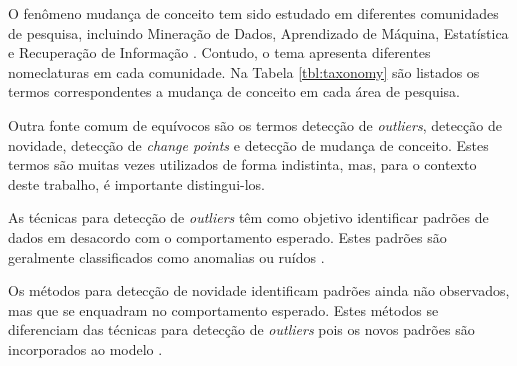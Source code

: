 \documentclass[msc, classic, a4paper]{ufbathesis}
\begin{document}
O fenômeno mudança de conceito tem sido estudado em diferentes comunidades de pesquisa, incluindo Mineração de Dados,
Aprendizado de Máquina, Estatística e Recuperação de Informação \cite{Zliobaite:2010}.
Contudo, o tema apresenta diferentes nomeclaturas em cada comunidade.
Na Tabela \ref{tbl:taxonomy} são listados os termos correspondentes a mudança de conceito em cada área de pesquisa.

\begin{table}[!ht]
    \caption{Terminologia - Mudança de Conceito \cite{Zliobaite:2010}}
    \label{tbl:taxonomy}
    \centering
\end{table}

Outra fonte comum de equívocos são os termos detecção de \textit{outliers}, detecção de novidade, detecção de \textit{change points} e detecção de mudança de conceito.
Estes termos são muitas vezes utilizados de forma indistinta, mas, para o contexto deste trabalho, é importante distingui-los.

As técnicas para detecção de \textit{outliers} têm como objetivo identificar padrões de dados em desacordo com o comportamento esperado. Estes padrões são geralmente classificados como anomalias ou ruídos \cite{Chandola:2009:ADS:1541880.1541882}.

Os métodos para detecção de novidade identificam padrões ainda não observados, mas que se enquadram no comportamento esperado.
Estes métodos se diferenciam das técnicas para detecção de \textit{outliers} pois os novos padrões são incorporados ao modelo \cite{Chandola:2009:ADS:1541880.1541882}.
\end{document}
